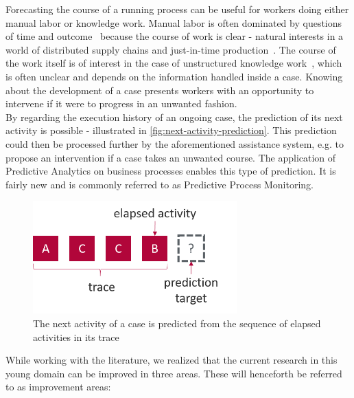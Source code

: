 Forecasting the course of a running process can be useful for workers doing either manual labor or knowledge work. Manual labor is often dominated by questions of time and outcome~\cite{rogge2013} because the course of work is clear - natural interests in a world of distributed supply chains and just-in-time production~\cite{web:economist:jit}. The course of the work itself is of interest in the case of unstructured knowledge work~\cite{francescomarino2015}, which is often unclear and depends on the information handled inside a case. Knowing about the development of a case presents workers with an opportunity to intervene if it were to progress in an unwanted fashion.\\

By regarding the execution history of an ongoing case, the prediction of its next activity is possible - illustrated in \autoref{fig:next-activity-prediction}. This prediction could then be processed further by the aforementioned assistance system, e.g. to propose an intervention if a case takes an unwanted course. The application of Predictive Analytics on business processes enables this type of prediction. It is fairly new and is commonly referred to as Predictive Process Monitoring.

\begin{figure}
    \centering
    \includegraphics[width=0.7\textwidth]{gfx/next-activity.png}
    \caption[Next-activity prediction from a trace]{The next activity of a case is predicted from the sequence of elapsed activities in its trace}
    \label{fig:next-activity-prediction}
\end{figure}

While working with the literature, we realized that the current research in this young domain can be improved in three areas. These will henceforth be referred to as improvement areas:

